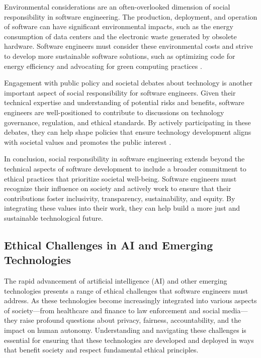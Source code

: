 \begin{refsection}
Environmental considerations are an often-overlooked dimension of social responsibility in software engineering. The production, deployment, and operation of software can have significant environmental impacts, such as the energy consumption of data centers and the electronic waste generated by obsolete hardware. Software engineers must consider these environmental costs and strive to develop more sustainable software solutions, such as optimizing code for energy efficiency and advocating for green computing practices \cite[pp.~203-206]{schneier2018click}.

Engagement with public policy and societal debates about technology is another important aspect of social responsibility for software engineers. Given their technical expertise and understanding of potential risks and benefits, software engineers are well-positioned to contribute to discussions on technology governance, regulation, and ethical standards. By actively participating in these debates, they can help shape policies that ensure technology development aligns with societal values and promotes the public interest \cite[pp.~134-137]{morozov2015delusion}.

In conclusion, social responsibility in software engineering extends beyond the technical aspects of software development to include a broader commitment to ethical practices that prioritize societal well-being. Software engineers must recognize their influence on society and actively work to ensure that their contributions foster inclusivity, transparency, sustainability, and equity. By integrating these values into their work, they can help build a more just and sustainable technological future.

\subsection{Ethical Challenges in AI and Emerging Technologies}

The rapid advancement of artificial intelligence (AI) and other emerging technologies presents a range of ethical challenges that software engineers must address. As these technologies become increasingly integrated into various aspects of society—from healthcare and finance to law enforcement and social media—they raise profound questions about privacy, fairness, accountability, and the impact on human autonomy. Understanding and navigating these challenges is essential for ensuring that these technologies are developed and deployed in ways that benefit society and respect fundamental ethical principles.


\end{refsection}

